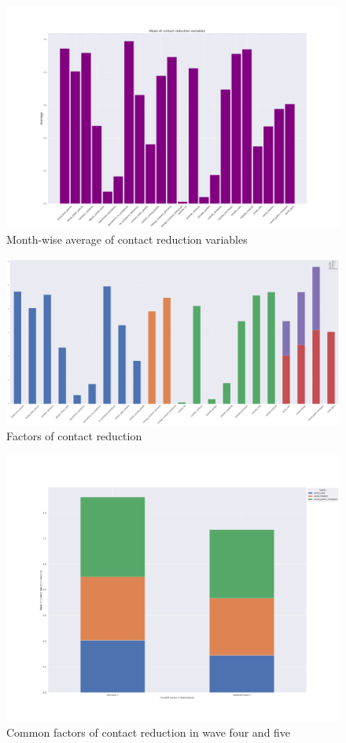 \documentclass[11pt, a4paper, leqno]{article}
\begin{document}
\begin{figure}[H]
    \caption{Month-wise average of contact reduction variables}
    \includegraphics[width=\textwidth]{../../bld/figures/contact_reduction_variables}
\end{figure}

\begin{figure}[H]
    \caption{Factors of contact reduction}
    \includegraphics[width=\textwidth]{../../bld/figures/contact_reduction_variables_2}
\end{figure}
\begin{figure}[H]
    \caption{Common factors of contact reduction in wave four and five}
    \includegraphics[width=\textwidth]{../../bld/figures/transition_wave4-_wave5}
\end{figure}
\pagebreak
\end{document}
